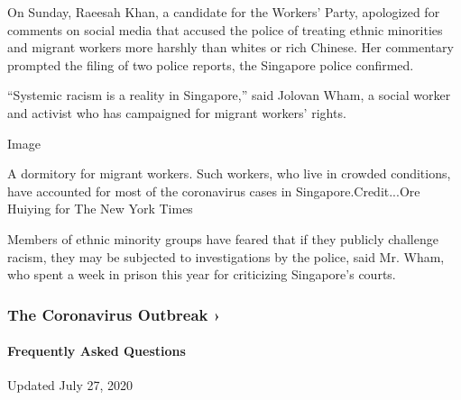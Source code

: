 ​On Sunday, Raeesah Khan, a ​​candidate for the Workers' Party​​,
apologized for comments on social media that accused the police of
treating ethnic minorities and migrant workers more harshly than whites
or rich Chinese. Her commentary prompted the filing of two police
reports, the Singapore police confirmed.

``Systemic racism is a reality in Singapore,'' said Jolovan Wham, a
social worker and activist who has campaigned for migrant workers'
rights.

Image

A dormitory for migrant workers. Such workers, who live in crowded
conditions, have accounted for most of the coronavirus cases in
Singapore.Credit...Ore Huiying for The New York Times

Members of ethnic minority groups have feared that if they publicly
challenge racism, they may be subjected to investigations by the police,
said Mr. Wham, who spent a week in prison this year for criticizing
Singapore's courts.

\href{https://www.nytimes3xbfgragh.onion/news-event/coronavirus?action=click\&pgtype=Article\&state=default\&region=MAIN_CONTENT_3\&context=storylines_faq}{}

\hypertarget{the-coronavirus-outbreak-}{%
\subsubsection{The Coronavirus Outbreak
›}\label{the-coronavirus-outbreak-}}

\hypertarget{frequently-asked-questions}{%
\paragraph{Frequently Asked
Questions}\label{frequently-asked-questions}}

Updated July 27, 2020

